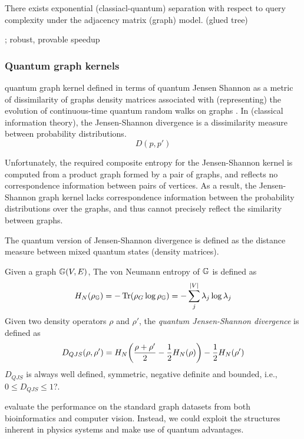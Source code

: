 \begin{theorem}
	There exists exponential (classiacl-quantum) separation with respect to query complexity under the adjacency matrix (graph) model. (glued tree)
\end{theorem}
\cite{zhengSpeedingLearningQuantum2022};
robust, provable speedup
\cite{liuRigorousRobustQuantum2021}

\subsubsection{Quantum graph kernels}
quantum graph kernel defined in terms of quantum Jensen Shannon as a metric of dissimilarity of graphs
density matrices associated with (representing) the evolution of continuous-time quantum random walks on graphs
\cite{baiQuantumJensenShannon2015}.
In (classical information theory), the Jensen-Shannon divergence is a dissimilarity measure between probability distributions.
\begin{equation}
	D(p,p')
\end{equation}
\cite{baiQuantumKernelsUnattributed2017}
\begin{remark}
	Unfortunately, the required composite entropy for the Jensen-Shannon kernel is computed from a product graph formed by a pair of graphs,
	and reflects no correspondence information between pairs of vertices.
	As a result, the Jensen-Shannon graph kernel lacks correspondence information between the probability distributions over the graphs,
	and thus cannot precisely reflect the similarity between graphs.
\end{remark}
The quantum version of Jensen-Shannon divergence is defined as the distance measure between mixed quantum states (density matrices).
\begin{definition}[]
	Given a graph $\mathbb{G}(V,E)$, The von Neumann entropy of $\mathbb{G}$ is defined as
	\begin{equation}
		H_N (\rho_{\mathbb{G}}) = -\Tr(\rho_{G}\log \rho_{\mathbb{G}})
		= - \sum_{j}^{\abs{V}} \lambda_j \log \lambda_j
	\end{equation}
	Given two density operators $\rho$ and $\rho'$,
	the \emph{quantum Jensen-Shannon divergence} is defined as
	\begin{equation}
		D_{QJS} (\rho,\rho') = 
		H_N\qty(\frac{\rho+\rho'}{2}- \frac{1}{2}H_N(\rho)) - \frac{1}{2} H_N (\rho')
	\end{equation}
	$D_{QJS}$ is always well defined, symmetric, negative definite and bounded, i.e., $0\le D_{QJS}\le 1$?.
\end{definition}
evaluate the performance on the standard graph datasets from both bioinformatics and computer vision.
Instead, we could exploit the structures inherent in physics systems and make use of quantum advantages.


